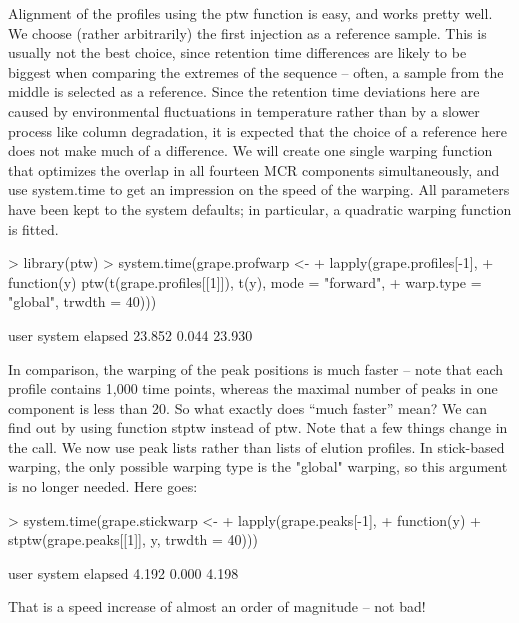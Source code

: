 \documentclass[a4paper,11pt]{article}
\newcommand{\code}[1]{{\ttfamily #1}}
\begin{document}
Alignment of the profiles using the ptw function is easy, and works
pretty well. We choose (rather arbitrarily) the first injection as a
reference sample. This is usually not the best choice, since retention
time differences are likely to be biggest when comparing the extremes
of the sequence -- often, a sample from the middle is selected as a
reference. Since the retention time deviations here are caused by
environmental fluctuations in temperature rather than by a slower
process like column degradation, it is expected that the choice of a
reference here does not make much of a difference. We will create one
single warping function that optimizes the overlap in all fourteen MCR
components simultaneously, and use \code{system.time} to get an
impression on the speed of the warping. All parameters have been kept
to the system defaults; in particular, a quadratic warping function is
fitted.
\begin{Schunk}
\begin{Sinput}
> library(ptw)
> system.time(grape.profwarp <- 
+   lapply(grape.profiles[-1],
+          function(y) ptw(t(grape.profiles[[1]]), t(y), mode = "forward",
+                          warp.type = "global", trwdth = 40)))
\end{Sinput}
\begin{Soutput}
   user  system elapsed 
 23.852   0.044  23.930 
\end{Soutput}
\end{Schunk}

In comparison, the warping of the peak positions is much faster --
note that each profile contains 1,000 time points, whereas the maximal
number of peaks in one component is less than 20. So what exactly does
``much faster'' mean? We can find out by using function \code{stptw}
instead of \code{ptw}. Note that a few things change in the
call. We now use peak lists rather than lists of elution
profiles. In stick-based warping, the only possible warping type is
the \code{"global"} warping, so this argument is no longer
needed. Here goes: 
\begin{Schunk}
\begin{Sinput}
> system.time(grape.stickwarp <- 
+   lapply(grape.peaks[-1], 
+          function(y) 
+            stptw(grape.peaks[[1]], y, trwdth = 40)))
\end{Sinput}
\begin{Soutput}
   user  system elapsed 
  4.192   0.000   4.198 
\end{Soutput}
\end{Schunk}
That is a speed increase of almost an order of magnitude -- not bad!
\end{document}
